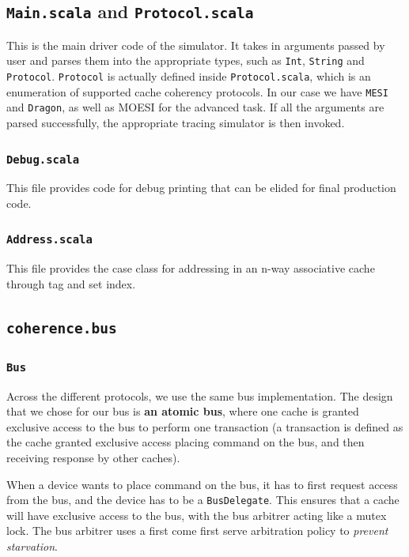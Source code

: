 \documentclass[nonacm,acmsmall,screen,11pt]{acmart}
\begin{document}
\subsection{\texttt{Main.scala} and \texttt{Protocol.scala}}
This is the main driver code of the simulator.
It takes in arguments passed by user and parses them into the appropriate types, such as \texttt{Int}, \texttt{String} and \texttt{Protocol}.
\texttt{Protocol} is actually defined inside \texttt{Protocol.scala}, which is an enumeration of supported cache coherency protocols.
In our case we have \texttt{MESI} and \texttt{Dragon}, as well as MOESI for the advanced task.
If all the arguments are parsed successfully, the appropriate tracing simulator is then invoked.

\subsubsection{\texttt{Debug.scala}}
This file provides code for debug printing that can be elided for final production code.

\subsubsection{\texttt{Address.scala}}
This file provides the case class for addressing in an n-way associative cache through tag and set index.

\subsection{\texttt{coherence.bus}}

\subsubsection{\texttt{Bus}}
Across the different protocols, we use the same bus implementation. The design that we chose for our bus is \textbf{an atomic bus}, where one cache is granted exclusive access to the bus to perform one transaction (a transaction is defined as the cache granted exclusive access placing command on the bus, and then receiving response by other caches).

When a device wants to place command on the bus, it has to first request access from the bus, and the device has to be a \texttt{BusDelegate}.
This ensures that a cache will have exclusive access to the bus, with the bus arbitrer acting like a mutex lock.
The bus arbitrer uses a first come first serve arbitration policy to \emph{prevent starvation}.
\end{document}
